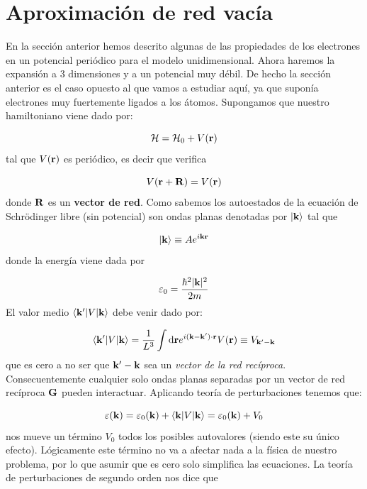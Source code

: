 \section{Aproximación de red vacía}

En la sección anterior hemos descrito algunas de las propiedades de los electrones en un potencial periódico para el modelo unidimensional. Ahora haremos la expansión a 3 dimensiones y a un potencial muy débil. De hecho la sección anterior es el caso opuesto al que vamos a estudiar aquí, ya que suponía electrones muy fuertemente ligados a los átomos. Supongamos que nuestro hamiltoniano viene dado por:

\begin{equation}
	\mathcal{H} = \mathcal{H}_0 + V(\mathbf{r})
\end{equation}
tal que $V(\mathbf{r})$ es periódico, es decir que verifica 

\begin{equation}
	V(\mathbf{r}+\mathbf{R})=V(\mathbf{r})
\end{equation}
donde $\mathbf{R}$ es un \textbf{vector de red}. Como sabemos los autoestados de la ecuación de Schrödinger libre (sin potencial) son ondas planas denotadas por $|\mathbf{k}\rangle$ tal que

\begin{equation}
	|\mathbf{k}\rangle \equiv A e^{i\mathbf{k} \mathbf{r}}
\end{equation}
donde la energía viene dada por

\begin{equation}
	\varepsilon_0 = \frac{\hbar^2 |\mathbf{k}|^2}{2m}
\end{equation}
El valor medio $\langle \mathbf{k}'|V|\mathbf{k} \rangle$ debe venir dado por:


\begin{equation}
	\langle \mathbf{k}'|V|\mathbf{k} \rangle  = \frac{1}{L^3} \int \mathrm{d} \mathbf{r} e^{i(\mathbf{k}-\mathbf{k}')\cdot \mathbf{r}} V(\mathbf{r}) \equiv V_{\mathbf{k}'-\mathbf{k}}
\end{equation}
que es cero a no ser que $\mathbf{k}'-\mathbf{k}$ sea un \textit{vector de la red recíproca}. Consecuentemente cualquier solo ondas planas separadas por un vector de red recíproca $\mathbf{G}$ pueden interactuar. Aplicando teoría de perturbaciones tenemos que:

\begin{equation}
	\varepsilon(\mathbf{k})  =\varepsilon_0 (\mathbf{k}) + \langle \mathbf{k} |V|\mathbf{k} \rangle = \varepsilon_0 (\mathbf{k}) + V_0
\end{equation}
nos mueve un término $V_0$ todos los posibles autovalores (siendo este su único efecto). Lógicamente este término no va a afectar nada a la física de nuestro problema, por lo que asumir que es cero solo simplifica las ecuaciones. La teoría de perturbaciones de segundo orden nos dice que


